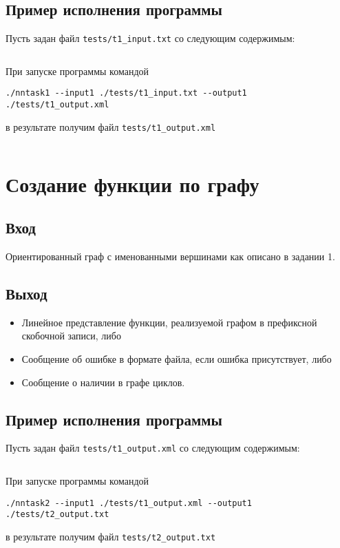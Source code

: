 \documentclass[spec, och, labwork]{SCWorks}
\begin{document}
\subsection*{Пример исполнения программы}

Пусть задан файл \verb|tests/t1_input.txt| со следующим содержимым:
\inputminted{text}{../tests/t1_input.txt}

При запуске программы командой
\begin{verbatim}
./nntask1 --input1 ./tests/t1_input.txt --output1 ./tests/t1_output.xml
\end{verbatim}
в результате получим файл \verb|tests/t1_output.xml|
\inputminted{xml}{../tests/t1_output.xml}


\section{Создание функции по графу}

\subsection*{Вход}

Ориентированный граф с именованными вершинами как описано в задании 1.

\subsection*{Выход}

\begin{itemize}
  \item
    Линейное представление функции, реализуемой графом в префиксной скобочной
    записи, либо
  \item Сообщение об ошибке в формате файла, если ошибка присутствует, либо
  \item Сообщение о наличии в графе циклов.
\end{itemize}

\subsection*{Пример исполнения программы}

Пусть задан файл \verb|tests/t1_output.xml| со следующим содержимым:
\inputminted{xml}{../tests/t1_output.xml}

При запуске программы командой
\begin{verbatim}
./nntask2 --input1 ./tests/t1_output.xml --output1 ./tests/t2_output.txt
\end{verbatim}
в результате получим файл \verb|tests/t2_output.txt|
\inputminted{xml}{../tests/t2_output.txt}
\end{document}
